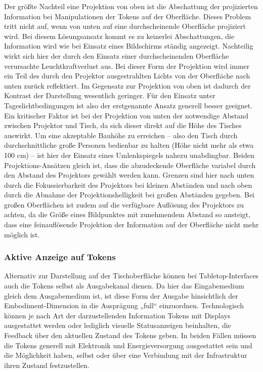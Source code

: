 Der größte Nachteil eine Projektion von oben ist die Abschattung der projizierten Information bei Manipulationen der Tokens auf der Oberfläche. Dieses Problem tritt nicht auf, wenn von unten auf eine durchscheinende Oberfläche projiziert wird. Bei diesem Lösungsansatz kommt es zu keinerlei Abschattungen, die Information wird wie bei Einsatz eines Bildschirms ständig angezeigt. Nachteilig wirkt sich hier der durch den Einsatz einer durchscheinenden Oberfläche verursachte Leuchtkraftverlust aus. Bei dieser Form der Projektion wird immer ein Teil des durch den Projektor ausgestrahlten Lichts von der Oberfläche nach unten zurück reflektiert. Im Gegensatz zur Projektion von oben ist dadurch der Kontrast der Darstellung wesentlich geringer. Für den Einsatz unter Tageslichtbedingungen ist also der erstgenannte Ansatz generell besser geeignet. Ein kritischer Faktor ist bei der Projektion von unten der notwendige Abstand zwischen Projektor und Tisch, da sich dieser direkt auf die Höhe des Tisches auswirkt. Um eine akzeptable Bauhöhe zu erreichen -- also den Tisch durch durchschnittliche große Personen bedienbar zu halten (Höhe nicht mehr als etwa 100 cm) -- ist hier der Einsatz eines Umlenkspiegels nahezu unabdingbar. Beiden Projektions-Ansätzen gleich ist, dass die abzudeckende Oberfläche variabel durch den Abstand des Projektors gewählt werden kann. Grenzen sind hier nach unten durch die Fokussierbarkeit des Projektors bei kleinen Abständen und nach oben durch die Abnahme der Projektionshelligkeit bei großen Abständen gegeben. Bei großen Oberflächen ist zudem auf die verfügbare Auflösung des Projektors zu achten, da die Größe eines Bildpunktes mit zunehmendem Abstand so ansteigt, dass eine feinauflösende Projektion der Information auf der Oberfläche nicht mehr möglich ist.


\subsubsection{Aktive Anzeige auf Tokens} %
\label{ssub:aktive_anzeige_auf_tokens}

Alternativ zur Darstellung auf der Tischoberfläche können bei Tabletop-Interfaces auch die Tokens selbst als Ausgabekanal dienen. Da hier das Eingabemedium gleich dem Ausgabemedium ist, ist diese Form der Ausgabe hinsichtlich der Embodiment-Dimension in die Ausprägung „full“ einzuordnen. Technologisch können je nach Art der darzustellenden Information Tokens mit Displays ausgestattet werden oder lediglich visuelle Statusanzeigen beinhalten, die Feedback über den aktuellen Zustand des Tokens geben. In beiden Fällen müssen die Tokens generell mit Elektronik und Energieversorgung ausgestattet sein und die Möglichkeit haben, selbst oder über eine Verbindung mit der Infrastruktur ihren Zustand festzustellen.


